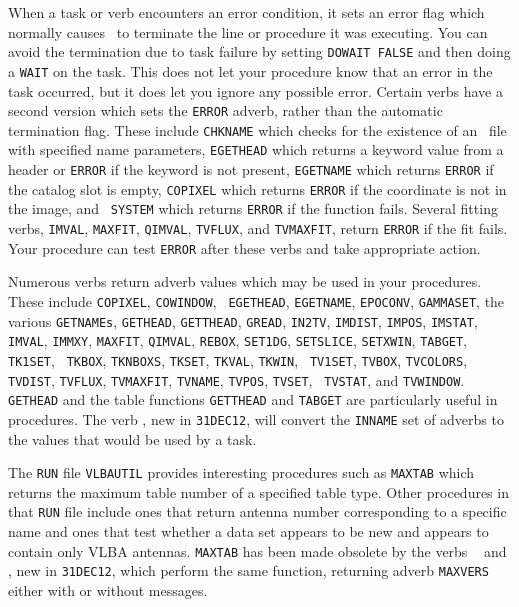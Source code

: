 
When a task or verb encounters an error condition, it sets an error
flag which normally causes \POPS\ to terminate the line or procedure
it was executing.  You can avoid the termination due to task failure
by setting {\tt DOWAIT FALSE} and then doing a {\tt WAIT} on the task.
This does not let your procedure know that an error in the task
occurred, but it does let you ignore any possible error.  Certain
verbs have a second version which sets the {\tt ERROR} adverb, rather
than the automatic termination flag.  These include {\tt CHKNAME}
which checks for the existence of an \AIPS\ file with specified name
parameters, {\tt EGETHEAD} which returns a keyword value from a header
or {\tt ERROR} if the keyword is not present, {\tt EGETNAME} which
returns {\tt ERROR} if the catalog slot is empty, {\tt COPIXEL} which
returns {\tt ERROR} if the coordinate is not in the image, and {\tt
SYSTEM} which returns {\tt ERROR} if the function fails.  Several
fitting verbs, {\tt IMVAL}, {\tt MAXFIT}, {\tt QIMVAL}, {\tt TVFLUX},
and {\tt TVMAXFIT}, return {\tt ERROR} if the fit fails.  Your
procedure can test {\tt ERROR} after these verbs and take appropriate
action.

Numerous verbs return adverb values which may be used in your
procedures.  These include {\tt COPIXEL}, {\tt  COWINDOW}, {\tt
EGETHEAD}, {\tt  EGETNAME}, {\tt EPOCONV}, {\tt  GAMMASET}, the
various {\tt GETNAMEs}, {\tt  GETHEAD}, {\tt  GETTHEAD}, {\tt  GREAD},
{\tt IN2TV}, {\tt  IMDIST}, {\tt  IMPOS}, {\tt  IMSTAT}, {\tt  IMVAL},
{\tt IMMXY}, {\tt  MAXFIT}, {\tt  QIMVAL}, {\tt  REBOX}, {\tt SET1DG},
{\tt SETSLICE}, {\tt  SETXWIN}, {\tt  TABGET}, {\tt  TK1SET}, {\tt
TKBOX}, {\tt  TKNBOXS}, {\tt  TKSET}, {\tt TKVAL}, {\tt  TKWIN}, {\tt
TV1SET}, {\tt  TVBOX}, {\tt  TVCOLORS}, {\tt  TVDIST}, {\tt  TVFLUX},
{\tt  TVMAXFIT}, {\tt TVNAME}, {\tt  TVPOS}, {\tt  TVSET}, {\tt
TVSTAT}, and {\tt  TVWINDOW}\@.  {\tt GETHEAD} and the table functions
{\tt GETTHEAD} and {\tt TABGET} are particularly useful in
procedures.  The verb {\tt {}}, new in {\tt 31DEC12}, will
convert the {\tt INNAME} set of adverbs to the values that would be
used by a task.

The {\tt RUN} file {\tt VLBAUTIL} provides interesting procedures such
as {\tt MAXTAB} which returns the maximum table number of a specified
table type.  Other procedures in that {\tt RUN} file include ones that
return antenna number corresponding to a specific name and ones that
test whether a data set appears to be new and appears to contain only
VLBA antennas.  {\tt MAXTAB} has been made obsolete by the verbs {\tt
{}} and {\tt {}}, new in {\tt 31DEC12}, which
perform the same function, returning adverb {\tt MAXVERS} either with
or without messages.

